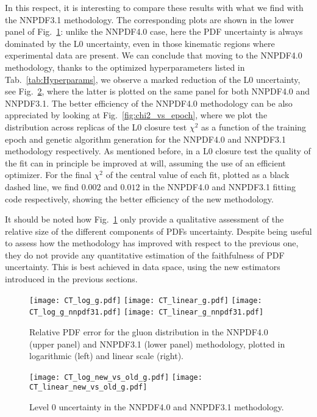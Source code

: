 In this respect, it is interesting to compare these results with what we find
with the NNPDF3.1 methodology. The corresponding plots are shown in the lower panel of
Fig.~\ref{fig:CT_uncertainty_g}: unlike the NNPDF4.0 case, here the PDF
uncertainty is always dominated by the L0 uncertainty, even in those kinematic
regions where experimental data are present. We can conclude that moving to the
NNPDF4.0 methodology, thanks to the optimized hyperparameters listed in Tab.~\ref{tab:Hyperparams},
we observe a marked reduction of the L0 uncertainty, 
see Fig.~\ref{fig:CT_uncertainty_new_vs_old}, where the latter is plotted on the same panel
for both NNPDF4.0 and NNPDF3.1. 
The better efficiency of the NNPDF4.0 methodology can be also appreciated
by looking at Fig.~\ref{fig:chi2_vs_epoch}, where we plot the distribution
across replicas of the L0 closure test $\chi^2$
as a function of the training epoch and genetic algorithm generation
for the NNPDF4.0 and NNPDF3.1 methodology respectively. As mentioned before, in a L0
closure test the quality of the fit can in principle be improved at will,
assuming the use of an efficient optimizer. For the final $\chi^2$ of the
central value of each fit, plotted as a black dashed line, we find $0.002$ and
$0.012$ in the NNPDF4.0 and NNPDF3.1 fitting code respectively, showing the better
efficiency of the new methodology. 

It should be noted how
Fig.~\ref{fig:CT_uncertainty_g}  only
provide a qualitative assessment of the relative size of the different
components of PDFs uncertainty. Despite being useful to assess how the
methodology has improved with respect to the previous one, they do not provide
any quantitative estimation of the faithfulness of PDF uncertainty. This is best
achieved in data space, using the new estimators introduced in the previous
sections.

\begin{figure}[h]
    \centering
    \texttt{[image: CT\_log\_g.pdf]}
    \texttt{[image: CT\_linear\_g.pdf]}
    \texttt{[image: CT\_log\_g\_nnpdf31.pdf]}
    \texttt{[image: CT\_linear\_g\_nnpdf31.pdf]}
    \caption{Relative PDF error for the gluon distribution in the NNPDF4.0 (upper panel)
    and NNPDF3.1 (lower panel) methodology, plotted in logarithmic (left) and linear scale (right).}
    \label{fig:CT_uncertainty_g}    
\end{figure}

\begin{figure}[h]
    \centering
    \texttt{[image: CT\_log\_new\_vs\_old\_g.pdf]}
    \texttt{[image: CT\_linear\_new\_vs\_old\_g.pdf]}
    \caption{Level 0 uncertainty in the NNPDF4.0 and NNPDF3.1 methodology.}
    \label{fig:CT_uncertainty_new_vs_old}    
\end{figure}

